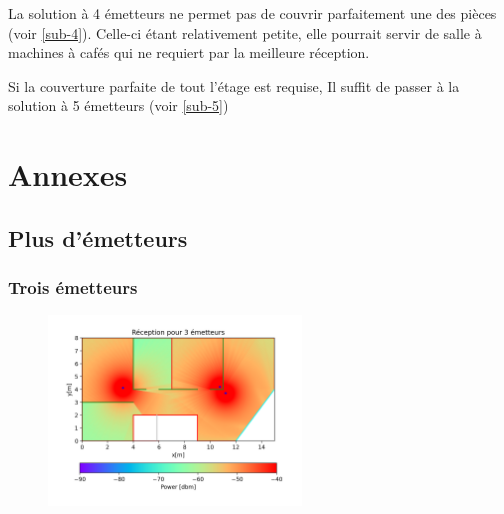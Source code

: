 \documentclass[sn-mathphys-num]{sn-jnl}
\begin{document}
La solution à 4 émetteurs ne permet pas de couvrir parfaitement
une des pièces (voir \ref{sub-4}). Celle-ci étant
relativement petite, elle pourrait servir de salle à machines à cafés
qui ne requiert par la meilleure réception.

Si la couverture parfaite de tout l'étage est requise, 
Il suffit de passer à la solution à 5 émetteurs (voir \ref{sub-5})



\section{Annexes}


\subsection{Plus d'émetteurs}\label{sub:more_emit}
\subsubsection{Trois émetteurs}
\label{sub-3}

\begin{figure}[H]
    \centering
    \includegraphics[width=0.6\textwidth]{images/optimize/3_dbm.png}
\end{figure}
\end{document}
